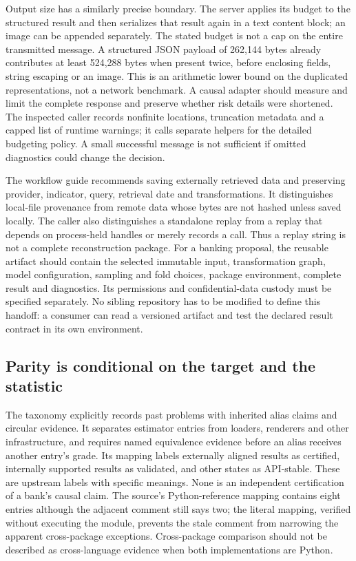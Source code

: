 Output size has a similarly precise boundary. The server applies its budget
to the structured result and then serializes that result again in a text
content block; an image can be appended separately. The stated budget is not
a cap on the entire transmitted message. A structured JSON payload of
262,144 bytes already contributes at least 524,288 bytes when present twice,
before enclosing fields, string escaping or an image. This is an arithmetic
lower bound on the duplicated representations, not a network benchmark.
A causal adapter should measure and limit the complete response and preserve
whether risk details were shortened. The inspected caller records nonfinite
locations, truncation metadata and a capped list of runtime warnings; it calls
separate helpers for the detailed budgeting policy. A small successful message
is not sufficient if omitted diagnostics could change the decision.
\citep{exec23_statspai_contract,exec23_statspai_contract_reference}

The workflow guide recommends saving externally retrieved data and preserving
provider, indicator, query, retrieval date and transformations. It distinguishes
local-file provenance from remote data whose bytes are not hashed unless saved
locally. The caller also distinguishes a standalone replay from a replay that
depends on process-held handles or merely records a call. Thus a replay string
is not a complete reconstruction package. For a banking proposal, the reusable
artifact should contain the selected immutable input, transformation graph,
model configuration, sampling and fold choices, package environment, complete
result and diagnostics. Its permissions and confidential-data custody must be
specified separately. No sibling repository has to be modified to define this
handoff: a consumer can read a versioned artifact and test the declared result
contract in its own environment.
\citep{exec23_statspai_contract}

\subsection{Parity is conditional on the target and the statistic}
\label{exec23:statspai-contract-parity}
The taxonomy explicitly records past problems with inherited alias claims and
circular evidence. It separates estimator entries from loaders, renderers and
other infrastructure, and requires named equivalence evidence before an alias
receives another entry's grade. Its mapping labels externally aligned results
as certified, internally supported results as validated, and other states as
API-stable. These are upstream labels with specific meanings. None is an
independent certification of a bank's causal claim. The source's Python-reference
mapping contains eight entries although the adjacent comment still says two;
the literal mapping, verified without executing the module, prevents the stale
comment from narrowing the apparent cross-package exceptions. Cross-package
comparison should not be described as cross-language evidence when both
implementations are Python.
\citep{exec23_statspai_contract,exec23_statspai_contract_reference}

